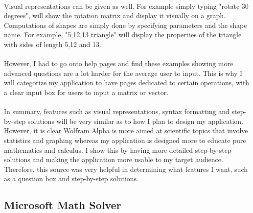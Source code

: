 \documentclass[final]{cmpreport}
\begin{document}
	\\Visual representations can be given as well. For example simply typing "rotate 30 degrees", will show the rotation matrix and display it visually on a graph.
	Computations of shapes are simply done by specifying parameters and the shape name. For example, "5,12,13 triangle" will display the properties of the triangle with sides of length 5,12 and 13.\\
	\\However, I had to go onto help pages and find these examples showing more advanced questions are a lot harder for the average user to input. This is why I will categorize my application to have pages dedicated to certain operations, with a clear input box for users to input a matrix or vector.\\
	\\In summary, features such as visual representations, syntax formatting and step-by-step solutions will be very similar as to how I plan to design my application. However, it is clear Wolfram Alpha is more aimed at scientific topics that involve statistics and graphing whereas my application is designed more to educate pure mathematics and calculus. I show this by having more detailed step-by-step solutions and making the application more usable to my target audience. Therefore, this source was very helpful in determining what features I want, such as a question box and step-by-step solutions. \\
	
	\subsection{Microsoft Math Solver} \label{sec:math}
	
\end{document}
